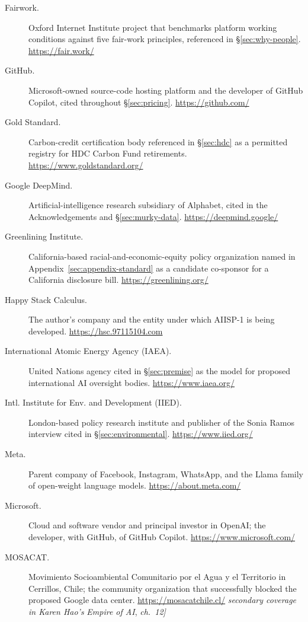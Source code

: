 \documentclass[10pt,a4paper,twocolumn]{article}
\begin{document}
\begin{description}
\item[Fairwork.] Oxford Internet Institute project that benchmarks platform working conditions against five fair-work principles, referenced in \S\ref{sec:why-people}. \url{https://fair.work/}

\item[GitHub.] Microsoft-owned source-code hosting platform and the developer of GitHub Copilot, cited throughout \S\ref{sec:pricing}. \url{https://github.com/}

\item[Gold Standard.] Carbon-credit certification body referenced in \S\ref{sec:hdc} as a permitted registry for HDC Carbon Fund retirements. \url{https://www.goldstandard.org/}

\item[Google DeepMind.] Artificial-intelligence research subsidiary of Alphabet, cited in the Acknowledgements and \S\ref{sec:murky-data}. \url{https://deepmind.google/}

\item[Greenlining Institute.] California-based racial-and-economic-equity policy organization named in Appendix~\ref{sec:appendix-standard} as a candidate co-sponsor for a California disclosure bill. \url{https://greenlining.org/}

\item[Happy Stack Calculus.] The author's company and the entity under which AIISP-1 is being developed. \url{https://hsc.97115104.com}

\item[International Atomic Energy Agency (IAEA).] United Nations agency cited in \S\ref{sec:premise} as the model for proposed international AI oversight bodies. \url{https://www.iaea.org/}

\item[Intl. Institute for Env. and Development (IIED).] London-based policy research institute and publisher of the Sonia Ramos interview cited in \S\ref{sec:environmental}. \url{https://www.iied.org/}

\item[Meta.] Parent company of Facebook, Instagram, WhatsApp, and the Llama family of open-weight language models. \url{https://about.meta.com/}

\item[Microsoft.] Cloud and software vendor and principal investor in OpenAI; the developer, with GitHub, of GitHub Copilot. \url{https://www.microsoft.com/}

\item[MOSACAT.] Movimiento Socioambiental Comunitario por el Agua y el Territorio in Cerrillos, Chile; the community organization that successfully blocked the proposed Google data center. \url{https://mosacatchile.cl/} \emph{secondary coverage in Karen Hao's }\emph{Empire of AI}, \emph{ch.~12]}


\end{description}
\end{document}
